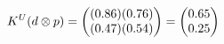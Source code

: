 \documentclass[preview]{standalone}
\begin{document}
\begin{align*}
\special{dvisvgm:raw <g id='unique000'>}K^U(d \otimes p) = \begin{pmatrix} (0.86)(0.76) \\ (0.47)(0.54) \end{pmatrix} = \begin{pmatrix} 0.65 \\ 0.25 \end{pmatrix}\special{dvisvgm:raw </g>}
\end{align*}
\end{document}
